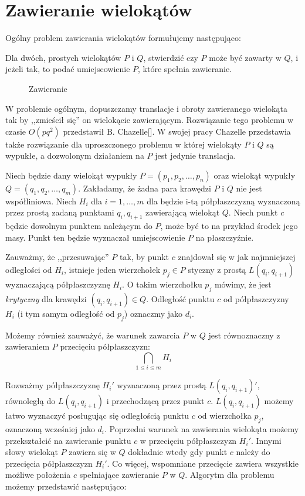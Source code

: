 \chapter{Zawieranie wielokątów}
Ogólny problem zawierania wielokątów formułujemy następująco:

\begin{problem}
  Dla dwóch, prostych wielokątów $P$ i $Q$, stwierdzić czy $P$ może
  być zawarty w $Q$, i jeżeli tak, to podać umiejscowienie $P$, które
  spełnia zawieranie.
\end{problem}

\begin{figure}[htp]
  \caption{Zawieranie}
\end{figure}

W problemie ogólnym, dopuszczamy translacje i obroty zawieranego
wielokąta tak by ,,zmieścił się'' on wielokącie
zawierającym. Rozwiązanie tego problemu w czasie $O(pq^2)$ przedstawił
B. Chazelle[]. W swojej pracy Chazelle przedstawia także rozwiązanie
dla uproszczonego problemu w której wielokąty $P$ i $Q$ są wypukłe, a
dozwolonym działaniem na $P$ jest jedynie translacja.

Niech będzie dany wielokąt wypukły $P = (p_1, p_2, \ldots, p_n)$ oraz
wielokąt wypukły $Q = (q_1, q_2, \ldots, q_m)$. Zakładamy, że żadna
para krawędzi $P$ i $Q$ nie jest współliniowa. Niech $H_i$ dla $i = 1,
\ldots, m$ dla będzie i-tą półpłaszczyzną wyznaczoną przez prostą
zadaną punktami $q_i, q_{i+1}$ zawierającą wielokąt $Q$. Niech punkt
$c$ będzie dowolnym punktem należącym do $P$, może być to na przykład
środek jego masy. Punkt ten będzie wyznaczał umiejscowienie $P$ na
płaszczyźnie.

Zauważmy, że ,,przesuwając'' $P$ tak, by punkt $c$ znajdował się w jak
najmniejszej odległości od $H_i$, istnieje jeden wierzchołek $p_j \in
P$ styczny z prostą $L(q_i, q_{i+1})$ wyznaczającą półpłaszczyznę
$H_i$. O takim wierzchołku $p_j$ mówimy, że jest \emph{krytyczny} dla
krawędzi $(q_i, q_{i+1}) \in Q$. Odległość punktu $c$ od
półpłaszczyzny $H_i$ (i tym samym odległość od $p_j$) oznaczmy jako
$d_i$.

Możemy również zauważyć, że warunek zawarcia $P$ w $Q$ jest
równoznaczny z zawieraniem $P$ przecięciu półpłaszczyzn:
\[
       \bigcap_{1 \leq i \leq m} H_i
\]

Rozważmy półpłaszczyznę $H_i'$ wyznaczoną przez prostą
$L(q_i,q_{i+1})'$, równoległą do $L(q_i, q_{i+1})$ i przechodzącą
przez punkt $c$.  $L(q_i,q_{i+1})$ możemy łatwo wyznaczyć posługując
się odległością punktu $c$ od wierzchołka $p_j$, oznaczoną wcześniej
jako $d_i$. Poprzedni warunek na zawierania wielokąta możemy
przekształcić na zawieranie punktu $c$ w przecięciu półpłaszczyzn
$H_i'$. Innymi słowy wielokąt $P$ zawiera się w $Q$ dokładnie wtedy
gdy punkt $c$ należy do przecięcia półpłaszczyzn $H_i'$. Co więcej,
wspomniane przecięcie zawiera wszystkie możliwe położenia $c$
spełniające zawieranie $P$ w $Q$. Algorytm dla problemu możemy
przedstawić następująco:

